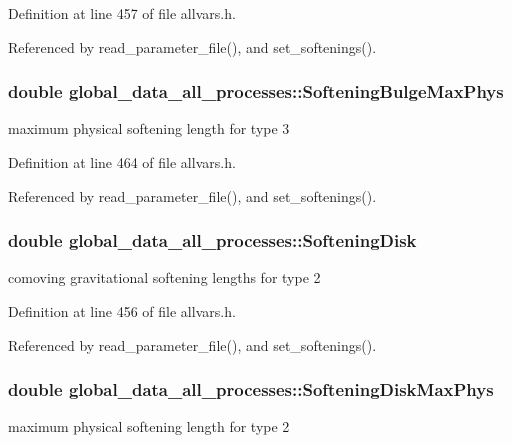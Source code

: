 Definition at line 457 of file allvars.h.



Referenced by read\_\-parameter\_\-file(), and set\_\-softenings().

\hypertarget{structglobal__data__all__processes_a215c28ea2e54629e8537bd9868401fa7}{
\subsubsection[{SofteningBulgeMaxPhys}]{\setlength{\rightskip}{0pt plus 5cm}double {\bf global\_\-data\_\-all\_\-processes::SofteningBulgeMaxPhys}}}
\label{structglobal__data__all__processes_a215c28ea2e54629e8537bd9868401fa7}
maximum physical softening length for type 3 

Definition at line 464 of file allvars.h.



Referenced by read\_\-parameter\_\-file(), and set\_\-softenings().

\hypertarget{structglobal__data__all__processes_a4a4453f9f76bb91ff3418d864caf3222}{
\subsubsection[{SofteningDisk}]{\setlength{\rightskip}{0pt plus 5cm}double {\bf global\_\-data\_\-all\_\-processes::SofteningDisk}}}
\label{structglobal__data__all__processes_a4a4453f9f76bb91ff3418d864caf3222}
comoving gravitational softening lengths for type 2 

Definition at line 456 of file allvars.h.



Referenced by read\_\-parameter\_\-file(), and set\_\-softenings().

\hypertarget{structglobal__data__all__processes_a575a685feed5223ffc7c5b42b2b369b9}{
\subsubsection[{SofteningDiskMaxPhys}]{\setlength{\rightskip}{0pt plus 5cm}double {\bf global\_\-data\_\-all\_\-processes::SofteningDiskMaxPhys}}}
\label{structglobal__data__all__processes_a575a685feed5223ffc7c5b42b2b369b9}
maximum physical softening length for type 2 

